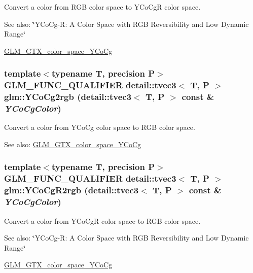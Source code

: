 Convert a color from RGB color space to YCoCgR color space. \begin{Desc}
\item[See also:]\char`\"{}YCoCg-R: A Color Space with RGB Reversibility and Low Dynamic Range\char`\"{} 

\hyperlink{group__gtx__color__space___y_co_cg}{GLM\_\-GTX\_\-color\_\-space\_\-YCoCg} \end{Desc}
\hypertarget{group__gtx__color__space___y_co_cg_g68b8a9930f61718c6e819245e04f52a1}{
\subsubsection[YCoCg2rgb]{\setlength{\rightskip}{0pt plus 5cm}template$<$typename T, precision P$>$ GLM\_\-FUNC\_\-QUALIFIER detail::tvec3$<$ T, P $>$ glm::YCoCg2rgb (detail::tvec3$<$ T, P $>$ const \& {\em YCoCgColor})}}
\label{group__gtx__color__space___y_co_cg_g68b8a9930f61718c6e819245e04f52a1}


Convert a color from YCoCg color space to RGB color space. \begin{Desc}
\item[See also:]\hyperlink{group__gtx__color__space___y_co_cg}{GLM\_\-GTX\_\-color\_\-space\_\-YCoCg} \end{Desc}
\hypertarget{group__gtx__color__space___y_co_cg_gecf0b1d1103554b9ec4e274f8284f7ad}{
\subsubsection[YCoCgR2rgb]{\setlength{\rightskip}{0pt plus 5cm}template$<$typename T, precision P$>$ GLM\_\-FUNC\_\-QUALIFIER detail::tvec3$<$ T, P $>$ glm::YCoCgR2rgb (detail::tvec3$<$ T, P $>$ const \& {\em YCoCgColor})}}
\label{group__gtx__color__space___y_co_cg_gecf0b1d1103554b9ec4e274f8284f7ad}


Convert a color from YCoCgR color space to RGB color space. \begin{Desc}
\item[See also:]\char`\"{}YCoCg-R: A Color Space with RGB Reversibility and Low Dynamic Range\char`\"{} 

\hyperlink{group__gtx__color__space___y_co_cg}{GLM\_\-GTX\_\-color\_\-space\_\-YCoCg} \end{Desc}
